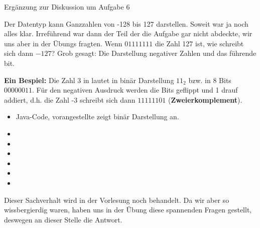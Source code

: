 \documentclass[11pt,helvet,german,worksheet]{ianmdoc_javaarbeitsblatt}
\date{\today}
\begin{document}
\setcounter{exercise}{98}

\begin{exercise}{Ergänzung zur Diskussion um Aufgabe 6}
\begin{body}
Der Datentyp  kann Ganzzahlen von -128 bis 127 darstellen.
Soweit war ja noch alles klar.
Irreführend war dann der Teil der die Aufgabe gar nicht abdeckte, wir uns aber in der Übungs fragten.
Wenn $01111111$ die Zahl 127 ist, wie schreibt sich dann $-127$?
Grob gesagt: Die Darstellung negativer Zahlen und das führende bit.

\textbf{Ein Bespiel:}
Die Zahl 3 in lautet in binär Darstellung $11_2$ bzw. in 8 Bits $00000011$.
Für den negativen Ausdruck werden die Bits geflippt und 1 drauf addiert, d.h. die Zahl -3 schreibt sich dann $11111101$ (\textbf{Zweierkomplement}).

\begin{itemize}
\item[] Java-Code, vorangestellte  zeigt binär Darstellung an.
\item {}
\item {}
\item {}
\item {}
\item {}
\item {}
\end{itemize}

Dieser Sachverhalt wird in der Vorlesung noch behandelt.
Da wir aber so wissbergierdig waren, haben uns in der Übung diese spannenden Fragen gestellt, deswegen an dieser Stelle die Antwort.
\end{body}
\end{exercise}
\end{document}
